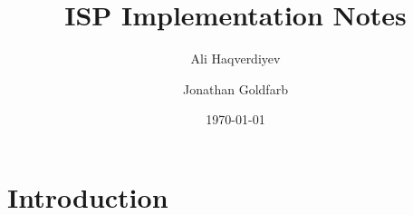 \documentclass[letterpaper, 10pt, draft]{amsart}
\let\institute\address%
\theoremstyle{definition}
\theoremstyle{remark}
\begin{document}
\title{ISP Implementation Notes}
\author{Ali Haqverdiyev \and Jonathan Goldfarb}
\institute{Department of Mathematical Sciences\\Florida Institute of
    Technology\\Melbourne, FL 32901}
\date{\today}


\maketitle

\tableofcontents{}

\section{Introduction}\label{sec:introduction}
\end{document}
